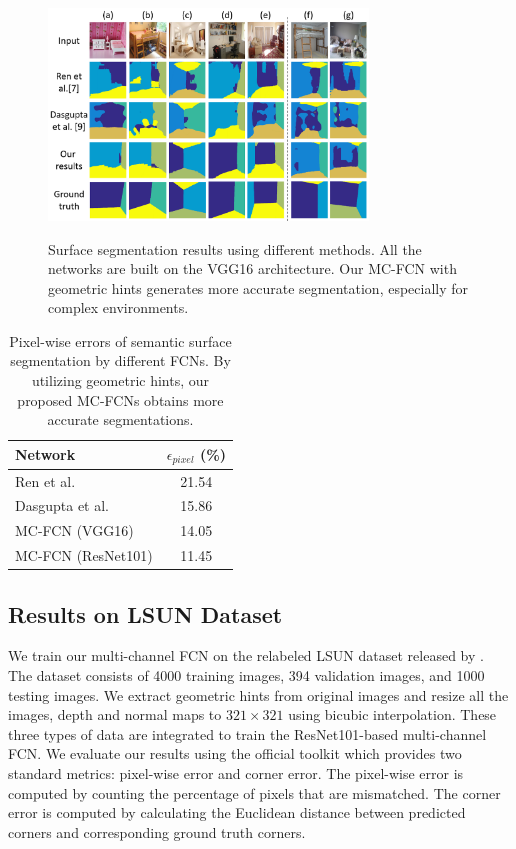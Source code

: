 \begin{figure}[!ht]
	\centering 
	\textsc{\includegraphics[width=8.5cm]{figure/compare1.png}}
	\caption{Surface segmentation results using different methods. All the networks are built on the VGG16 architecture. Our MC-FCN with geometric hints generates more accurate segmentation, especially for complex environments.}
	\label{fig:fcn-comparison}
\end{figure}

\begin{table}
	\centering
	\begin{tabular}{l|c} 
		\hline
		Network & $\epsilon_{pixel}$ (\%)\\
		\hline
		Ren et al.~\cite{ren2016coarse} & 21.54 \\
		Dasgupta et al.~\cite{dasgupta2016delay} & 15.86 \\  \hline
		MC-FCN (VGG16)  & 14.05 \\
		MC-FCN (ResNet101) & 11.45 \\
		\hline
	\end{tabular}
	\caption{Pixel-wise errors of semantic surface segmentation by different FCNs. By utilizing geometric hints, our proposed MC-FCNs obtains more accurate segmentations. }	
	\label{table:ablation}
\end{table}

\subsection{Results on LSUN Dataset}
\label{sec:LSUN}
We train our multi-channel FCN on the relabeled LSUN dataset released by \cite{ren2016coarse}. The dataset consists of 4000 training images, 394 validation images, and 1000 testing images. 
We extract geometric hints from original images and resize all the images, depth and normal maps to $321\times321$ using bicubic interpolation. 
These three types of data are integrated to train the ResNet101-based multi-channel FCN. 
We evaluate our results using the official toolkit which provides two standard metrics: pixel-wise error and corner error. The pixel-wise error is computed by counting the percentage of pixels that are mismatched. The corner error is computed by calculating the Euclidean distance between predicted corners and corresponding ground truth corners.

